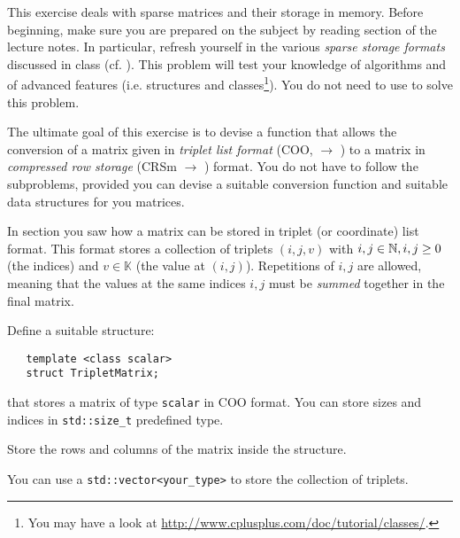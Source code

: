 \begin{problem}
 
  This exercise deals with sparse matrices and their storage in memory. Before
  beginning, make sure you are prepared on the subject by reading section
   of the lecture notes. In particular, refresh yourself in
  the various \emph{sparse storage formats} discussed in class
  (cf. ). This problem will test your knowledge of
  algorithms and of advanced \Cpp{} features (i.e. structures and
  classes\footnote{You may have a look at
    \href{http://www.cplusplus.com/doc/tutorial/classes/}{http://www.cplusplus.com/doc/tutorial/classes/}.}). You
  do not need to use \Eigen{} to solve this problem.
 
  The ultimate goal of this exercise is to devise a function that allows the
  conversion of a matrix given in \emph{triplet list format} (COO, $\to$
  ) to a matrix in \emph{compressed row storage} (CRSm $\to$
  ) format. You do not have to follow the subproblems, provided you
  can devise a suitable conversion function and suitable data structures for you
  matrices.
 
 \begin{subproblem}[2]
  In section  you saw how a matrix can be stored in triplet (or coordinate)  list format. This format stores a collection of triplets $(i,j,v)$ with $i,j \in \mathbb{N}, i,j \geq 0$ (the indices) and $v \in \mathbb{K}$ (the value at $(i,j)$). Repetitions of $i,j$ are allowed, meaning that the values at the same indices $i,j$ must be \emph{summed} together in the final matrix.
 
  Define a suitable structure:
  \begin{verbatim}
   template <class scalar>
   struct TripletMatrix;
  \end{verbatim}
  that stores a matrix of type \verb|scalar| in COO format. You can store sizes
  and indices in \verb|std::size_t| predefined type.
  
  \begin{hint}
   Store the rows and columns of the matrix inside the structure.
  \end{hint}
  
  \begin{hint}
   You can use a \verb|std::vector<your_type>| to store the collection of triplets.
  \end{hint}
  

\end{subproblem}
\end{problem}

